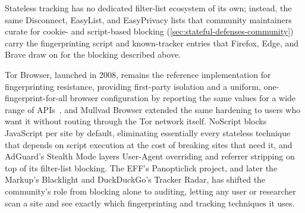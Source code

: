 %
Stateless tracking has no dedicated filter-list ecosystem of its own; instead, the same Disconnect, EasyList, and EasyPrivacy lists that community maintainers curate for cookie- and script-based blocking (\autoref{sec:stateful-defenses-community}) carry the fingerprinting script and known-tracker entries that Firefox, Edge, and Brave draw on for the blocking described above.


%
Tor Browser, launched in 2008, remains the reference implementation for fingerprinting resistance, providing first-party isolation and a uniform, one-fingerprint-for-all browser configuration by reporting the same values for a wide range of APIs~\cite{perryDesignImplementationTor2013}, and Mullvad Browser extended the same hardening to users who want it without routing through the Tor network itself.
%
NoScript blocks JavaScript per site by default, eliminating essentially every stateless technique that depends on script execution at the cost of breaking sites that need it, and AdGuard's Stealth Mode layers User-Agent overriding and referrer stripping on top of its filter-list blocking.
%
The EFF's Panopticlick project, and later the Markup's Blacklight and DuckDuckGo's Tracker Radar, has shifted the community's role from blocking alone to auditing, letting any user or researcher scan a site and see exactly which fingerprinting and tracking techniques it uses.


